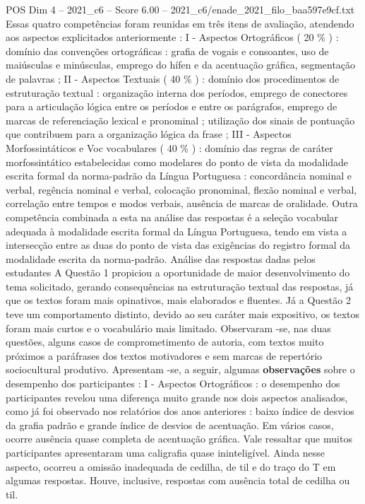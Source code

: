 \begin{textsample}{POS Dim 4 – 2021\_c6 – Score 6.00 – 2021\_c6/enade\_2021\_filo\_baa597e9cf.txt}
Essas quatro competências foram reunidas em três itens de avaliação, atendendo aos aspectos explicitados anteriormente : I - Aspectos Ortográficos ( 20 \% ) : domínio das convenções ortográficas : grafia de vogais e consoantes, uso de maiúsculas e minúsculas, emprego do hífen e da acentuação gráfica, segmentação de palavras ; II - Aspectos Textuais ( 40 \% ) : domínio dos procedimentos de estruturação textual : organização interna dos períodos, emprego de conectores para a articulação lógica entre os períodos e entre os parágrafos, emprego de marcas de referenciação lexical e pronominal ; utilização dos sinais de pontuação que contribuem para a organização lógica da frase ; III - Aspectos Morfossintáticos e Voc vocabulares ( 40 \% ) : domínio das regras de caráter morfossintático estabelecidas como modelares do ponto de vista da modalidade escrita formal da norma-padrão da Língua Portuguesa : concordância nominal e verbal, regência nominal e verbal, colocação pronominal, flexão nominal e verbal, correlação entre tempos e modos verbais, ausência de marcas de oralidade.
Outra competência combinada a esta na análise das respostas é a seleção vocabular adequada à modalidade escrita formal da Língua Portuguesa, tendo em vista a intersecção entre as duas do ponto de vista das exigências do registro formal da modalidade escrita da norma-padrão.
Análise das respostas dadas pelos estudantes A Questão 1 propiciou a oportunidade de maior desenvolvimento do tema solicitado, gerando consequências na estruturação textual das respostas, já que os textos foram mais opinativos, mais elaborados e fluentes.
Já a Questão 2 teve um comportamento distinto, devido ao seu caráter mais expositivo, os textos foram mais curtos e o vocabulário mais limitado.
Observaram -se, nas duas questões, alguns casos de comprometimento de autoria, com textos muito próximos a paráfrases dos textos motivadores e sem marcas de repertório sociocultural produtivo.
Apresentam -se, a seguir, algumas \textbf{observações} sobre o desempenho dos participantes : I - Aspectos Ortográficos : o desempenho dos participantes revelou uma diferença muito grande nos dois aspectos analisados, como já foi observado nos relatórios dos anos anteriores : baixo índice de desvios da grafia padrão e grande índice de desvios de acentuação.
Em vários casos, ocorre ausência quase completa de acentuação gráfica.
Vale ressaltar que muitos participantes apresentaram uma caligrafia quase ininteligível.
Ainda nesse aspecto, ocorreu a omissão inadequada de cedilha, de til e do traço do T em algumas respostas.
Houve, inclusive, respostas com ausência total de cedilha ou til.

\end{textsample}
